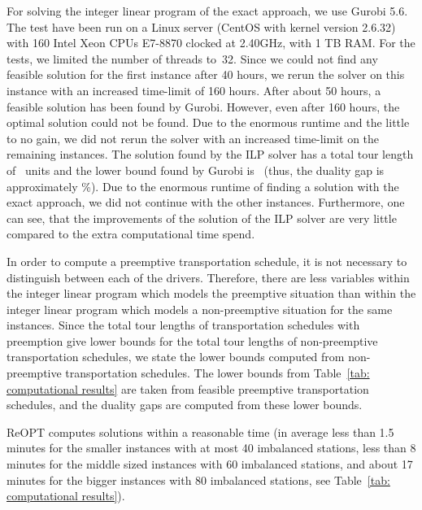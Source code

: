 \documentclass[english]{llncs}
\numberwithin{sublemma}{lemma}
\begin{document}
For solving the integer linear program of the exact approach, we use Gurobi 5.6.
The test have been run on a Linux server (CentOS with kernel version 2.6.32) with 160 Intel Xeon CPUs E7-8870 clocked at 2.40GHz, with 1 TB RAM.
For the tests, we limited the number of threads to~32.
Since we could not find any feasible solution for the first instance after 40 hours, we rerun the solver on this instance with an increased time-limit of 160 hours.
After about 50 hours, a feasible solution has been found by Gurobi.
However, even after 160 hours, the optimal solution could not be found.
Due to the enormous runtime and the little to no gain, we did not rerun the solver with an increased time-limit on the remaining instances.
The solution found by the ILP solver has a total tour length of~ units and the lower bound found by Gurobi is~ (thus, the duality gap is approximately \%).
Due to the enormous runtime of finding a solution with the exact approach, we did not continue with the other instances.
Furthermore, one can see, that the improvements of the solution of the ILP solver are very little compared to the extra computational time spend.

In order to compute a preemptive transportation schedule, it is not necessary to distinguish between each of the drivers.
Therefore, there are less variables within the integer linear program which models the preemptive situation than within the integer linear program which models a non-preemptive situation for the same instances.
Since the total tour lengths of transportation schedules with preemption give lower bounds for the total tour lengths of non-preemptive transportation schedules,
we state the lower bounds computed from non-preemptive transportation schedules.
The lower bounds from Table~\ref{tab: computational results} are taken from feasible preemptive transportation schedules, and the duality gaps are computed from these lower bounds.


ReOPT computes solutions within a reasonable time (in average less than 1.5 minutes for the smaller instances with at most 40 imbalanced stations,
less than 8 minutes for the middle sized instances with 60 imbalanced stations,
and about 17 minutes for the bigger instances with 80 imbalanced stations, see Table~\ref{tab: computational results}).
\end{document}
